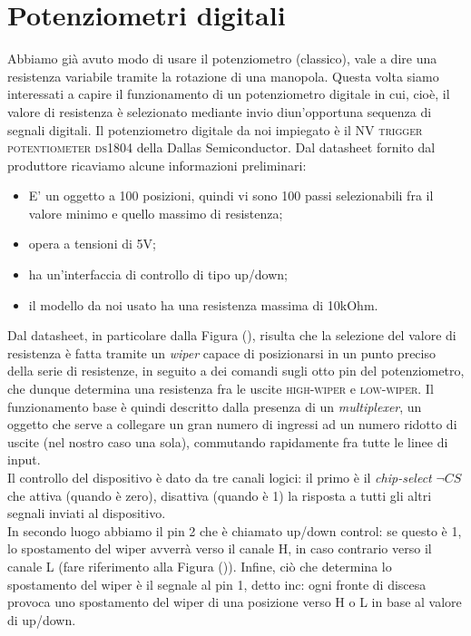 \documentclass[journal, a4paper]{IEEEtran}
\begin{document}
\section{Potenziometri digitali}
Abbiamo già avuto modo di usare il potenziometro (classico), vale a dire una resistenza variabile tramite la rotazione di una manopola. Questa volta siamo interessati a capire il funzionamento di un potenziometro digitale in cui, cioè, il valore di resistenza è selezionato mediante invio diun'opportuna sequenza di segnali digitali. Il potenziometro digitale da noi impiegato è il \textsc{NV trigger potentiometer ds1804} della Dallas Semiconductor. Dal datasheet fornito dal produttore ricaviamo alcune informazioni preliminari:

\begin{itemize}
\item E' un oggetto a 100 posizioni, quindi vi sono 100 passi selezionabili fra il valore minimo e quello massimo di resistenza;
\item opera a tensioni di 5V;
\item ha un'interfaccia di controllo di tipo up/down;
\item il modello da noi usato ha una resistenza massima di 10kOhm.
\end{itemize}

Dal datasheet, in particolare dalla Figura (), risulta che la selezione del valore di resistenza è fatta tramite un \textit{wiper} capace di posizionarsi in un punto preciso della serie di resistenze, in seguito a dei comandi sugli otto pin del potenziometro, che dunque determina una resistenza fra le uscite \textsc{high}-\textsc{wiper} e \textsc{low}-\textsc{wiper}. Il funzionamento base è quindi descritto dalla presenza di un \textit{multiplexer}, un oggetto che serve a collegare un gran numero di ingressi ad un numero ridotto di uscite (nel nostro caso una sola), commutando rapidamente fra tutte le linee di input.\\
Il controllo del dispositivo è dato da tre canali logici: il primo è il \textit{chip-select} $\neg CS$ che attiva (quando è zero), disattiva (quando è 1) la risposta a tutti gli altri segnali inviati al dispositivo.\\
In secondo luogo abbiamo il pin 2 che è chiamato up/down control: se questo è 1, lo spostamento del wiper avverrà verso il canale H, in caso contrario verso il canale L (fare riferimento alla Figura ()). Infine, ciò che determina lo spostamento del wiper è il segnale al pin 1, detto inc: ogni fronte di discesa provoca uno spostamento del wiper di una posizione verso H o L in base al valore di up/down.\\
\end{document}
